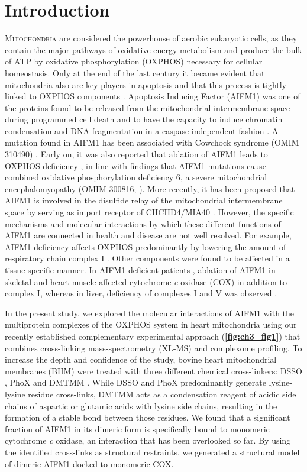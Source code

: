 \section{Introduction}
\lettrine[lraise=0.1, nindent=0em, slope=-.5em]{M}{itochondria} are considered the powerhouse of aerobic eukaryotic cells, as they contain the major pathways of oxidative energy metabolism and produce the bulk of ATP by oxidative phosphorylation (OXPHOS) necessary for cellular homeostasis. Only at the end of the last century it became evident that mitochondria also are key players in apoptosis and that this process is tightly linked to OXPHOS components \cite{RN1}. Apoptosis Inducing Factor (AIFM1) was one of the proteins found to be released from the mitochondrial intermembrane space during programmed cell death and to have the capacity to induce chromatin condensation and DNA fragmentation in a caspase-independent fashion \cite{RN2}. A mutation found in AIFM1 has been associated with Cowchock syndrome (OMIM 310490) \cite{RN3}. Early on, it was also reported that ablation of AIFM1 leads to OXPHOS deficiency \cite{RN4}, in line with findings that AIFM1 mutations cause combined oxidative phosphorylation deficiency 6, a severe mitochondrial encephalomyopathy (OMIM 300816; \cite{RN5}). More recently, it has been proposed that AIFM1 is involved in the disulfide relay of the mitochondrial intermembrane space by serving as import receptor of CHCHD4/MIA40 \cite{RN8, RN7, RN6}. However, the specific mechanisms and molecular interactions by which these different functions of AIFM1 are connected in health and disease are not well resolved. For example, AIFM1 deficiency affects OXPHOS predominantly by lowering the amount of respiratory chain complex I \cite{RN4}. Other components were found to be affected in a tissue specific manner. In AIFM1 deficient patients \cite{RN5}, ablation of AIFM1 in skeletal and heart muscle affected cytochrome \emph{c} oxidase (COX) in addition to complex I, whereas in liver, deficiency of complexes I and V was observed \cite{RN10, RN9}.

In the present study, we explored the molecular interactions of AIFM1 with the multiprotein complexes of the OXPHOS system in heart mitochondria using our recently established complementary experimental approach (\textbf{\autoref{fig:ch3_fig1}}) \cite{RN11} that combines cross-linking mass-spectrometry (XL-MS) and complexome profiling. To increase the depth and confidence of the study, bovine heart mitochondrial membranes (BHM) were treated with three different chemical cross-linkers: DSSO \cite{RN12}, PhoX \cite{RN13} and DMTMM \cite{RN14}. While DSSO and PhoX predominantly generate lysine-lysine residue cross-links, DMTMM acts as a condensation reagent of acidic side chains of aspartic or glutamic acids with lysine side chains, resulting in the formation of a stable bond between those residues. We found that a significant fraction of AIFM1 in its dimeric form is specifically bound to monomeric cytochrome \emph{c} oxidase, an interaction that has been overlooked so far. By using the identified cross-links as structural restraints, we generated a structural model of dimeric AIFM1 docked to monomeric COX.

